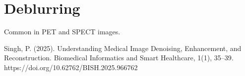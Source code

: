 \chapter{Deblurring}

Common in PET and SPECT images.

Singh, P. (2025). Understanding Medical Image Denoising, Enhancement, and Reconstruction. Biomedical Informatics and Smart Healthcare, 1(1), 35–39. https://doi.org/10.62762/BISH.2025.966762

